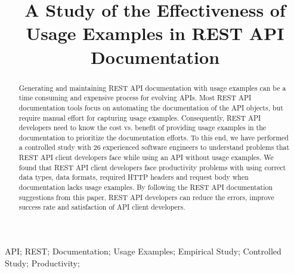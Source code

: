 \documentclass[conference]{IEEEtran}
\begin{document}
\title{A Study of the Effectiveness of Usage Examples in REST API Documentation}


 \author{
 \and
 \and
 }

\maketitle

\begin{abstract}
Generating and maintaining REST API documentation with usage examples can be a time consuming and expensive process for evolving APIs. Most REST API documentation tools focus on automating the documentation of the API objects, but require manual effort for capturing usage examples. Consequently, REST API developers need to know the cost vs. benefit of providing usage examples in the documentation to prioritize the documentation efforts. To this end, we have performed a controlled study with 26 experienced software engineers to understand problems that REST API client developers face while using an API without usage examples. We found that REST API client developers face productivity problems with using correct data types, data formats, required HTTP headers and request body when documentation lacks usage examples. By following the REST API documentation suggestions from this paper, REST API developers can reduce the errors, improve success rate and satisfaction of API client developers.


\end{abstract}



\begin{IEEEkeywords}
API; REST; Documentation; Usage Examples; Empirical Study; Controlled Study; Productivity;

\end{IEEEkeywords}
\end{document}
